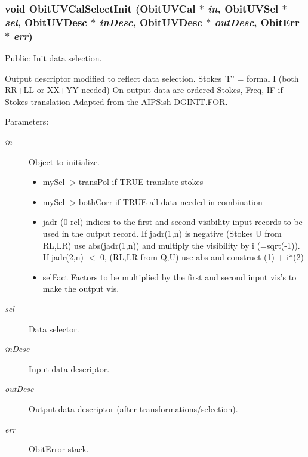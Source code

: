 \subsubsection{\setlength{\rightskip}{0pt plus 5cm}void Obit\-UVCal\-Select\-Init ({\bf Obit\-UVCal} $\ast$ {\em in}, {\bf Obit\-UVSel} $\ast$ {\em sel}, {\bf Obit\-UVDesc} $\ast$ {\em in\-Desc}, {\bf Obit\-UVDesc} $\ast$ {\em out\-Desc}, {\bf Obit\-Err} $\ast$ {\em err})}\label{ObitUVCalSelect_8h_a0}


Public: Init data selection. 

Output descriptor modified to reflect data selection. Stokes 'F' = formal I (both RR+LL or XX+YY needed) On output data are ordered Stokes, Freq, IF if Stokes translation Adapted from the AIPSish DGINIT.FOR. \begin{Desc}
\item[Parameters:]
\begin{description}
\item[{\em in}]Object to initialize. \begin{itemize}
\item my\-Sel-$>$trans\-Pol if TRUE translate stokes \item my\-Sel-$>$both\-Corr if TRUE all data needed in combination \item jadr (0-rel) indices to the first and second visibility input records to be used in the output record. If jadr(1,n) is negative (Stokes U from RL,LR) use abs(jadr(1,n)) and multiply the visibility by i (=sqrt(-1)). If jadr(2,n) $<$ 0, (RL,LR from Q,U) use abs and construct (1) + i$\ast$(2) \item sel\-Fact Factors to be multiplied by the first and second input vis's to make the output vis. \end{itemize}
\item[{\em sel}]Data selector. \item[{\em in\-Desc}]Input data descriptor. \item[{\em out\-Desc}]Output data descriptor (after transformations/selection). \item[{\em err}]Obit\-Error stack. \end{description}
\end{Desc}
